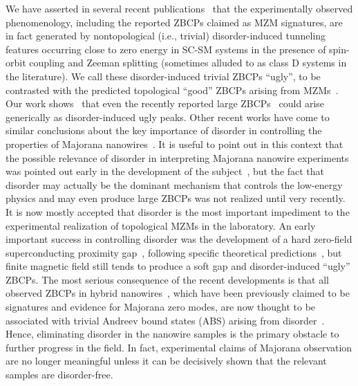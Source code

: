 \documentclass[aps,prmaterials,twocolumn,superscriptaddress,longbibliography]{revtex4-2}
\begin{document}
We have asserted in several recent
publications~\cite{pan2020generic,pan2020physical,pan2021threeterminal,pan2021disorder,woods2020electrostatic,lai2021theory,pan2021quantized,dassarma2021disorderinduced,woods2021charge}   that the experimentally observed phenomenology, including the reported ZBCPs claimed as MZM signatures, are in fact generated by nontopological (i.e., trivial) disorder-induced tunneling features occurring close to zero energy in SC-SM systems in the presence of spin-orbit coupling and Zeeman splitting (sometimes alluded to as class D systems in the literature).  We call these disorder-induced trivial ZBCPs ``ugly'', to be contrasted with the predicted topological ``good'' ZBCPs arising from MZMs~\cite{pan2020physical}. Our work shows~\cite{dassarma2021disorderinduced} that even the recently reported large ZBCPs~\cite{zhang2021large} could arise generically as disorder-induced ugly peaks.  Other recent works have come to similar conclusions about the key importance of disorder in controlling the properties of Majorana nanowires~\cite{pan2021quantized,woods2021charge,zeng2021partiallyseparated}.  It is useful to point out in this context that the possible relevance of disorder in interpreting Majorana nanowire experiments was pointed out early in the development of the subject~\cite{brouwer2011probability,bagrets2012class,pikulin2012zerovoltage,sau2013density,sau2012experimental}, but the fact that disorder may actually be the dominant mechanism that controls the low-energy physics and may even produce large ZBCPs was not realized until very recently. 
 It is now mostly accepted that disorder is the most important impediment to the experimental realization of topological MZMs in the laboratory. An early important success in controlling disorder was the development of a hard zero-field superconducting proximity gap~\cite{chang2015hard}, following specific theoretical predictions~\cite{takei2013soft}, but finite magnetic field still tends to produce a soft gap and disorder-induced ``ugly'' ZBCPs.  The most serious consequence of the recent developments is that all observed ZBCPs in hybrid nanowires~\cite{mourik2012signatures,das2012zerobias,deng2012anomalous,churchill2013superconductornanowire,finck2013anomalous, deng2016majorana,nichele2017scaling,zhang2017ballistic,kammhuber2017conductance,gul2018ballistic,vaitiekenas2018effective,moor2018electric,zhang2018quantizeda,bommer2019spinorbit,grivnin2019concomitant,anselmetti2019endtoend,menard2020conductancematrix,puglia2021closing,pan2020situ,zhang2021large}, which have been previously claimed to be signatures and evidence for Majorana zero modes, are now thought to be associated with trivial Andreev bound states (ABS) arising from disorder~\cite{pan2020physical,pan2020generic,dassarma2021disorderinduced,pan2021quantized,woods2021charge}. Hence, eliminating disorder in the nanowire samples is the primary obstacle to further progress in the field. In fact, experimental claims of Majorana observation are no longer meaningful unless it can be decisively shown that the relevant samples are disorder-free.
\end{document}
